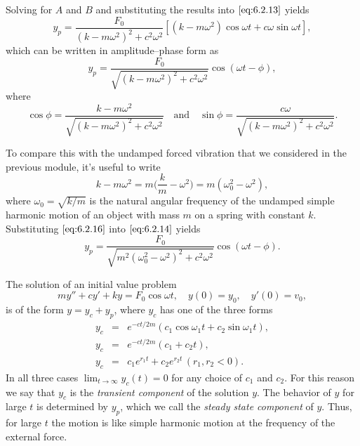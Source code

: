 \documentclass{ximera}
\begin{document}
Solving  for $A$ and $B$
and substituting the results into  $\eqref{eq:6.2.13}$ yields
$$
y_p=\frac{F_0}{(k-m\omega^2)^2+c^2\omega^2}
\left[(k-m\omega^2)\cos\omega t+c\omega\sin\omega t\right],
$$
which can be written in amplitude--phase form  as
\begin{equation}\label{eq:6.2.14} %
y_p=\frac{F_0}{\sqrt{(k-m\omega^2)^2+c^2\omega^2}}
\cos(\omega t-\phi),
\end{equation}
where
\begin{equation}\label{eq:6.2.15}
\cos\phi=\frac{k-m\omega^2}{\sqrt
{(k-m\omega^2)^2+c^2\omega^2}}\quad\mbox{and}\quad
\sin\phi=\frac{c\omega}{\sqrt{(k-m\omega^2)^2+c^2\omega^2}}.
\end{equation}
 
  To compare this with the undamped forced vibration
that we considered in the previous module, it's useful to write
\begin{equation}\label{eq:6.2.16}
k-m\omega^2=m\bigg(\frac{k}{m}-\omega^2\bigg)=
m(\omega_0^2-\omega^2),
\end{equation}
 where $\omega_0=\sqrt{k/m}$ is the natural
angular frequency of the undamped simple harmonic motion of an
object with mass $m$ on a spring with constant $k$.
Substituting $\eqref{eq:6.2.16}$ into $\eqref{eq:6.2.14}$ yields
\begin{equation}\label{eq:6.2.17}
y_p=\frac{F_0}{\sqrt{m^2(\omega^2_0-\omega^2)^2+
c^2\omega^2}}\cos(\omega t-\phi).
\end{equation}
 
The solution of an initial value problem
$$
my''+cy'+ky=F_0\cos\omega t, \quad  y(0)=y_0,\quad y'(0)=v_0,
$$
is of the form $y=y_c+y_p$,
where  $y_c$ has one of the three forms
\begin{eqnarray*}
y_c&=&e^{-ct/2m}(c_1\cos\omega_1t+c_2\sin\omega_1t),\\
 y_c&=&e^{-ct/2m}(c_1+c_2t),\\
y_c&=&c_1e^{r_1t}+c_2e^{r_2t}\,(r_1,r_2<0).
\end{eqnarray*}
In all three cases $\lim_{t\rightarrow\infty} y_c(t)=0$ for any choice of
$c_1$ and $c_2$. For this reason we say that $y_c$ is the \textit{transient component} of the solution $y$. The behavior of $y$ for
large $t$ is determined by $y_p$, which we call the \textit{steady state
component} of $y$. Thus, for large $t$ the motion is like simple
harmonic motion at the frequency of the external force.
 
\end{document}
